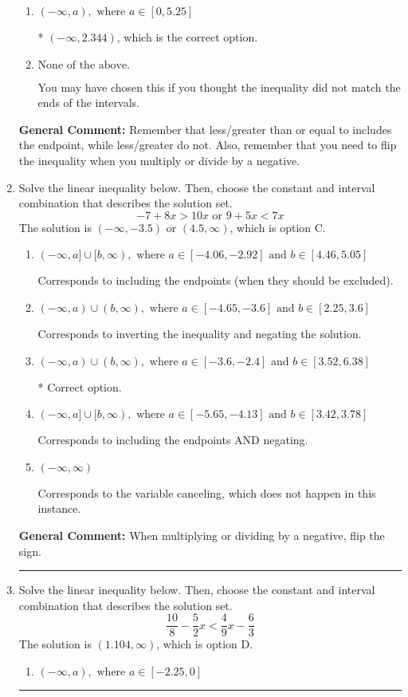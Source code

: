 \documentclass{extbook}[14pt]
\newcommand{\litem}[1]{\item #1

\rule{\textwidth}{0.4pt}}
\begin{document}
\begin{enumerate}
{\begin{enumerate}[label=\Alph*.]
 $(-\infty, -2.344)$, which corresponds to negating the endpoint of the solution.
\item \( (-\infty, a), \text{ where } a \in [0, 5.25] \)

* $(-\infty, 2.344)$, which is the correct option.
\item \( \text{None of the above}. \)

You may have chosen this if you thought the inequality did not match the ends of the intervals.
\end{enumerate}

\textbf{General Comment:} Remember that less/greater than or equal to includes the endpoint, while less/greater do not. Also, remember that you need to flip the inequality when you multiply or divide by a negative.
}
\litem{
Solve the linear inequality below. Then, choose the constant and interval combination that describes the solution set.
\[ -7 + 8 x > 10 x \text{ or } 9 + 5 x < 7 x \]The solution is \( (-\infty, -3.5) \text{ or } (4.5, \infty) \), which is option C.\begin{enumerate}[label=\Alph*.]
\item \( (-\infty, a] \cup [b, \infty), \text{ where } a \in [-4.06, -2.92] \text{ and } b \in [4.46, 5.05] \)

Corresponds to including the endpoints (when they should be excluded).
\item \( (-\infty, a) \cup (b, \infty), \text{ where } a \in [-4.65, -3.6] \text{ and } b \in [2.25, 3.6] \)

Corresponds to inverting the inequality and negating the solution.
\item \( (-\infty, a) \cup (b, \infty), \text{ where } a \in [-3.6, -2.4] \text{ and } b \in [3.52, 6.38] \)

 * Correct option.
\item \( (-\infty, a] \cup [b, \infty), \text{ where } a \in [-5.65, -4.13] \text{ and } b \in [3.42, 3.78] \)

Corresponds to including the endpoints AND negating.
\item \( (-\infty, \infty) \)

Corresponds to the variable canceling, which does not happen in this instance.
\end{enumerate}

\textbf{General Comment:} When multiplying or dividing by a negative, flip the sign.
}
\litem{
Solve the linear inequality below. Then, choose the constant and interval combination that describes the solution set.
\[ \frac{10}{8} - \frac{5}{2} x < \frac{4}{9} x - \frac{6}{3} \]The solution is \( (1.104, \infty) \), which is option D.\begin{enumerate}[label=\Alph*.]
\item \( (-\infty, a), \text{ where } a \in [-2.25, 0] \)


\end{enumerate}}
\end{enumerate}
\end{document}
